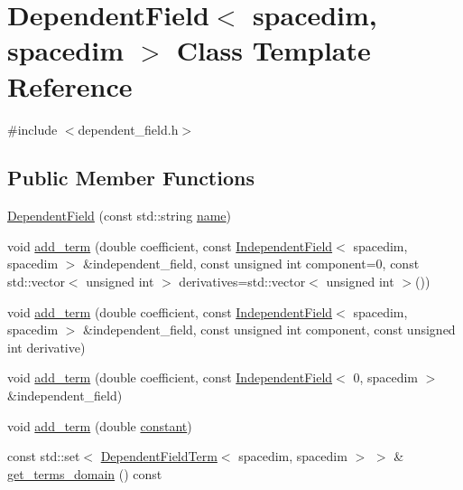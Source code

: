 \hypertarget{class_dependent_field_3_01spacedim_00_01spacedim_01_4}{}\section{Dependent\+Field$<$ spacedim, spacedim $>$ Class Template Reference}
\label{class_dependent_field_3_01spacedim_00_01spacedim_01_4}


{\ttfamily \#include $<$dependent\+\_\+field.\+h$>$}

\subsection*{Public Member Functions}
\begin{DoxyCompactItemize}
\item 
\hyperlink{class_dependent_field_3_01spacedim_00_01spacedim_01_4_a3b2090f3b7c66d84dbb41ec5e677ecfe}{Dependent\+Field} (const std\+::string \hyperlink{class_dependent_field_3_01spacedim_00_01spacedim_01_4_a99a47f4c10f0e472dbdc2b0945712e23}{name})
\item 
void \hyperlink{class_dependent_field_3_01spacedim_00_01spacedim_01_4_a9e0b93f36ef8bc10ee9028576db57390}{add\+\_\+term} (double coefficient, const \hyperlink{class_independent_field}{Independent\+Field}$<$ spacedim, spacedim $>$ \&independent\+\_\+field, const unsigned int component=0, const std\+::vector$<$ unsigned int $>$ derivatives=std\+::vector$<$ unsigned int $>$())
\item 
void \hyperlink{class_dependent_field_3_01spacedim_00_01spacedim_01_4_a79f3b134f21759492662b2f7173fff8e}{add\+\_\+term} (double coefficient, const \hyperlink{class_independent_field}{Independent\+Field}$<$ spacedim, spacedim $>$ \&independent\+\_\+field, const unsigned int component, const unsigned int derivative)
\item 
void \hyperlink{class_dependent_field_3_01spacedim_00_01spacedim_01_4_a25b4485644ccc8e2aeafddceadb33950}{add\+\_\+term} (double coefficient, const \hyperlink{class_independent_field}{Independent\+Field}$<$ 0, spacedim $>$ \&independent\+\_\+field)
\item 
void \hyperlink{class_dependent_field_3_01spacedim_00_01spacedim_01_4_a24fe77c93937f9563b3dac9e4520fd9b}{add\+\_\+term} (double \hyperlink{class_dependent_field_3_01spacedim_00_01spacedim_01_4_a24efc9c0928896be871908f050c406fc}{constant})
\item 
const std\+::set$<$ \hyperlink{class_dependent_field_term}{Dependent\+Field\+Term}$<$ spacedim, spacedim $>$ $>$ \& \hyperlink{class_dependent_field_3_01spacedim_00_01spacedim_01_4_abe2d6beee95fae305add085afa7b6119}{get\+\_\+terms\+\_\+domain} () const 

\end{DoxyCompactItemize}
